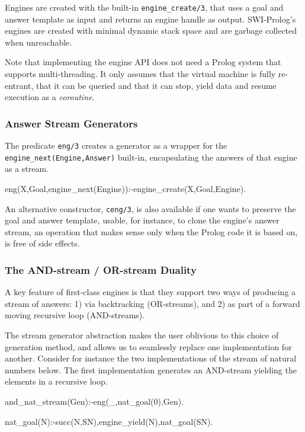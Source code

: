 \documentclass[submission,copyright,creativecommons]{eptcs}
\begin{document}
Engines are created with the built-in {\tt engine\_create/3}, that uses a goal
and answer template as input and returns an engine handle as output.
SWI-Prolog's engines are created with minimal dynamic stack space and are
garbage collected when unreachable.

Note that implementing the engine API does not need  a Prolog system that
supports multi-threading. It only assumes that the virtual machine is fully
re-entrant, that it can be queried and that it can stop, yield data and resume
execution as a {\em coroutine}.

\begin{comment}
As Prolog virtual machines, engines have  an internal state. Thus interacting with them requires a concise and expressive, but ultimately procedural API. This is not very different from what working with attributed variables, instrumental to adding constraint solvers, requires.
\end{comment}

\subsubsection{Answer Stream Generators}

The predicate {\tt eng/3} creates a generator as a wrapper for the {\tt
engine\_next(Engine,Answer)} built-in, encapsulating the answers of that engine
as a stream.
\begin{code}
eng(X,Goal,engine_next(Engine)):-engine_create(X,Goal,Engine). 
\end{code}
An alternative constructor, {\tt ceng/3}, is also available if one wants to preserve
the goal and answer template, usable, for instance, to clone
the engine's answer stream, an
operation that makes sense only when the Prolog code it is based on, 
is free of side effects.

\subsubsection{The AND-stream / OR-stream Duality}

A key feature of first-class engines is that they support two ways of producing
a stream of answers: 1) via backtracking (OR-streams), and 2) as part of a
forward moving recursive loop (AND-streams).

The stream generator abstraction makes the user oblivious to this choice of
generation method, and allows us to seamlessly replace one implementation 
for another. Consider for instance the two implementations of the stream of natural
numbers below.
The first implementation generates an AND-stream yielding the elements in a
recursive loop.
\begin{code}
and_nat_stream(Gen):-eng(_,nat_goal(0),Gen).

nat_goal(N):-succ(N,SN),engine_yield(N),nat_goal(SN).
\end{code}
\end{document}

